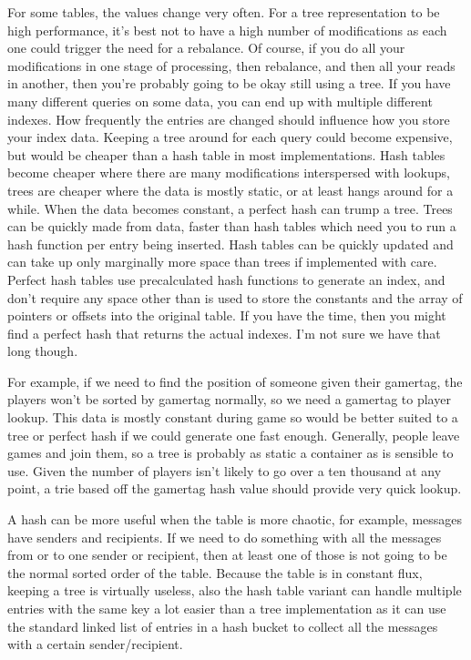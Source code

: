 For some tables, the values change very often. For a tree representation to be
high performance, it's best not to have a high number of modifications as each
one could trigger the need for a rebalance. Of course, if you do all your
modifications in one stage of processing, then rebalance, and then all your
reads in another, then you're probably going to be okay still using a tree.  If
you have many different queries on some data, you can end up with
multiple different indexes. How frequently the entries are changed should
influence how you store your index data. Keeping a tree around for each query
could become expensive, but would be cheaper than a hash table in most
implementations. Hash tables become cheaper where there are many modifications
interspersed with lookups, trees are cheaper where the data is mostly static,
or at least hangs around for a while. When the data becomes constant, a perfect
hash can trump a tree. Trees can be quickly made from data, faster than hash
tables which need you to run a hash function per entry being inserted. Hash
tables can be quickly updated and can take up only marginally more space than
trees if implemented with care. Perfect hash tables use precalculated hash
functions to generate an index, and don't require any space other than is used
to store the constants and the array of pointers or offsets into the original
table. If you have the time, then you might find a perfect hash that returns
the actual indexes. I'm not sure we have that long though.

For example, if we need to find the position of someone given their gamertag,
the players won't be sorted by gamertag normally, so we need a gamertag to
player lookup. This data is mostly constant during game so would be better
suited to a tree or perfect hash if we could generate one fast enough.
Generally, people leave games and join them, so a tree is probably as static a
container as is sensible to use. Given the number of players isn't likely to go
over a ten thousand at any point, a trie based off the gamertag hash value
should provide very quick lookup.

A hash can be more useful when the table is more chaotic, for example, messages
have senders and recipients. If we need to do something with all the messages
from or to one sender or recipient, then at least one of those is not going to
be the normal sorted order of the table. Because the table is in constant flux,
keeping a tree is virtually useless, also the hash table variant can handle
multiple entries with the same key a lot easier than a tree implementation as
it can use the standard linked list of entries in a hash bucket to collect all
the messages with a certain sender/recipient.


